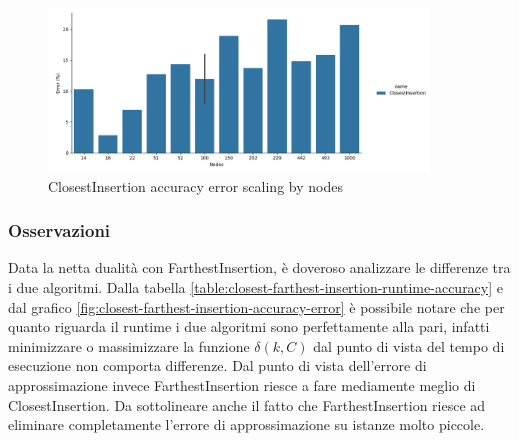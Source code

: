 \begin{figure}[H]
    \centering

    \includegraphics[width=0.9\textwidth]{./images/ClosestInsertion__approximation_error_.png}

    \caption{ClosestInsertion accuracy error scaling by nodes}
    \label{fig:closest-insertion-accuracy-error}
\end{figure}

\subsubsection{Osservazioni}

Data la netta dualità con FarthestInsertion, è doveroso analizzare
le differenze tra i due algoritmi. Dalla tabella
\ref{table:closest-farthest-insertion-runtime-accuracy}
e dal grafico \ref{fig:closest-farthest-insertion-accuracy-error}
è possibile notare che per quanto riguarda il runtime i due algoritmi
sono perfettamente alla pari, infatti minimizzare o massimizzare la
funzione $\delta (k, C)$ dal punto di vista del tempo di esecuzione
non comporta differenze. Dal punto di vista dell'errore di
approssimazione invece FarthestInsertion riesce a fare mediamente
meglio di ClosestInsertion. Da sottolineare anche il fatto che
FarthestInsertion riesce ad eliminare completamente l'errore di
approssimazione su istanze molto piccole.

